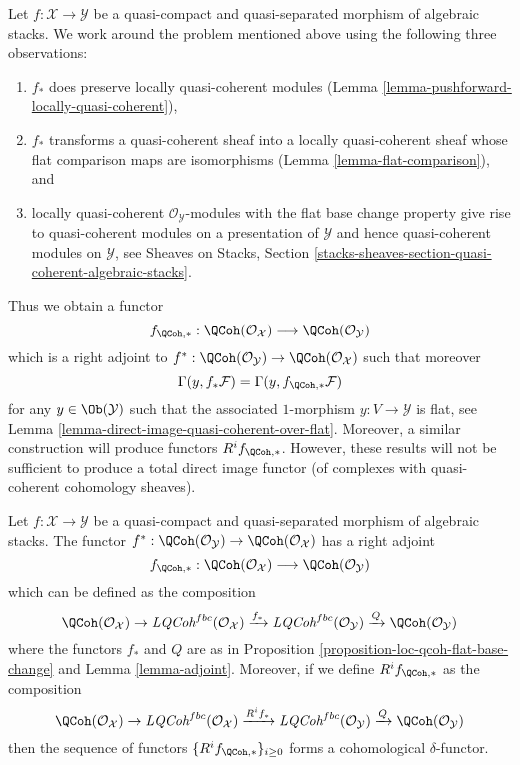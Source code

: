 \medskip\noindent
Let $f : \mathcal{X} \to \mathcal{Y}$ be a quasi-compact and
quasi-separated morphism of algebraic stacks. We work around the problem
mentioned above using the following three observations:
\begin{enumerate}
\item $f_*$ does preserve locally quasi-coherent
modules (Lemma \ref{lemma-pushforward-locally-quasi-coherent}),
\item $f_*$ transforms a quasi-coherent sheaf into a locally quasi-coherent
sheaf whose flat comparison maps are isomorphisms
(Lemma \ref{lemma-flat-comparison}), and
\item locally quasi-coherent $\mathcal{O}_\mathcal{Y}$-modules
with the flat base change property give rise to quasi-coherent
modules on a presentation of $\mathcal{Y}$ and hence quasi-coherent
modules on $\mathcal{Y}$, see
Sheaves on Stacks, Section
\ref{stacks-sheaves-section-quasi-coherent-algebraic-stacks}.
\end{enumerate}
Thus we obtain a functor
$$
f_{\QCoh, *} :
\QCoh(\mathcal{O}_\mathcal{X})
\longrightarrow
\QCoh(\mathcal{O}_\mathcal{Y})
$$
which is a right adjoint to
$f^* : \QCoh(\mathcal{O}_\mathcal{Y}) \to
\QCoh(\mathcal{O}_\mathcal{X})$
such that moreover
$$
\Gamma(y, f_*\mathcal{F}) = \Gamma(y, f_{\QCoh, *}\mathcal{F})
$$
for any $y \in \Ob(\mathcal{Y})$ such that the associated
$1$-morphism $y : V \to \mathcal{Y}$ is flat, see
Lemma \ref{lemma-direct-image-quasi-coherent-over-flat}.
Moreover, a similar construction will produce functors
$R^if_{\QCoh, *}$.
However, these results will not be sufficient to produce a
total direct image functor (of complexes with quasi-coherent
cohomology sheaves).

\begin{proposition}
\label{proposition-direct-image-quasi-coherent}
Let $f : \mathcal{X} \to \mathcal{Y}$ be a quasi-compact and quasi-separated
morphism of algebraic stacks. The functor
$f^* : \QCoh(\mathcal{O}_\mathcal{Y}) \to
\QCoh(\mathcal{O}_\mathcal{X})$
has a right adjoint
$$
f_{\QCoh, *} :
\QCoh(\mathcal{O}_\mathcal{X})
\longrightarrow
\QCoh(\mathcal{O}_\mathcal{Y})
$$
which can be defined as the composition
$$
\QCoh(\mathcal{O}_\mathcal{X}) \to
\textit{LQCoh}^{fbc}(\mathcal{O}_\mathcal{X})
\xrightarrow{f_*} \textit{LQCoh}^{fbc}(\mathcal{O}_\mathcal{Y})
\xrightarrow{Q} \QCoh(\mathcal{O}_\mathcal{Y})
$$
where the functors $f_*$ and $Q$ are as in
Proposition \ref{proposition-loc-qcoh-flat-base-change}
and
Lemma \ref{lemma-adjoint}.
Moreover, if we define $R^if_{\QCoh, *}$ as the composition
$$
\QCoh(\mathcal{O}_\mathcal{X}) \to
\textit{LQCoh}^{fbc}(\mathcal{O}_\mathcal{X})
\xrightarrow{R^if_*} \textit{LQCoh}^{fbc}(\mathcal{O}_\mathcal{Y})
\xrightarrow{Q} \QCoh(\mathcal{O}_\mathcal{Y})
$$
then the sequence of functors $\{R^if_{\QCoh, *}\}_{i \geq 0}$
forms a cohomological $\delta$-functor.
\end{proposition}

